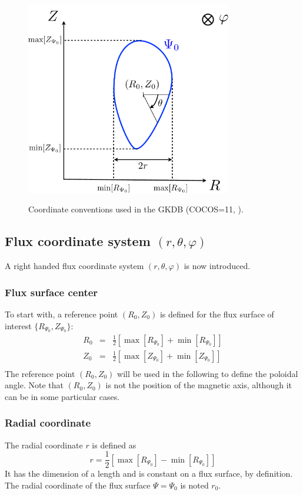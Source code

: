 \documentclass[fleqn]{report}
\begin{document}
\begin{figure}[h]
\begin{center}
  \includegraphics[width=9cm]{COCOS.pdf}\\
  \caption{\label{fig:coord1} Coordinate conventions used in the GKDB (COCOS=11, \cite{Sauter:CPC2013}).}
\end{center}
\end{figure}

\subsection{Flux coordinate system $(r,\theta,\varphi)$}
A right handed flux coordinate system $(r,\theta,\varphi)$ is now introduced.
\subsubsection{Flux surface center}
To start with, a reference point $(R_0,Z_0)$ is defined for the flux surface of interest $\{R_{\Psi_0},Z_{\Psi_0}\}$:
\begin{eqnarray}
 R_0 &=& \frac{1}{2}\left[\max[R_{\Psi_0}] + \min[R_{\Psi_0}]\right]\\
 Z_0 &=& \frac{1}{2}\left[\max[Z_{\Psi_0}] + \min[Z_{\Psi_0}]\right]\\
\end{eqnarray} 
The reference point  $(R_0,Z_0)$ will be used in the following to define the poloidal angle. Note that $(R_0,Z_0)$ is not the position of the magnetic axis, although it can be in some particular cases. 

\subsubsection{Radial coordinate}
The radial coordinate $r$ is defined as 
\begin{equation}
 r = \frac{1}{2}\left[\max[R_{\Psi_0}] - \min[R_{\Psi_0}]\right]
\end{equation}
It has the dimension of a length and is constant on a flux surface, by definition. The radial coordinate of the flux surface $\Psi=\Psi_0$ is noted $r_0$.
\end{document}
